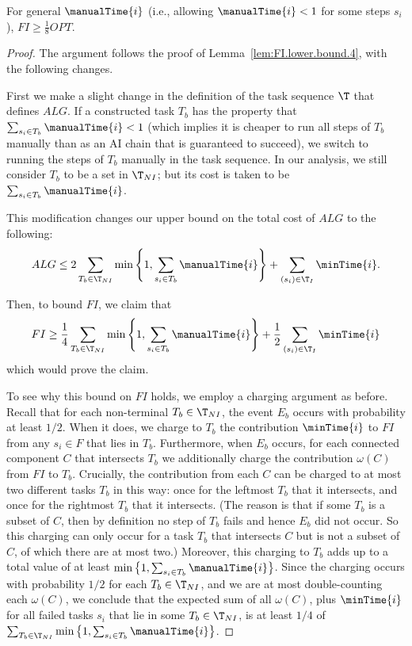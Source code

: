 \begin{lem}
\label{lem:FI.lower.bound.8}
    For general $\manualTime{i}$ (i.e., allowing $\manualTime{i} < 1$ for some steps $s_i$), $FI \geq \frac{1}{8}OPT$.
\end{lem}
\begin{proof}
    The argument follows the proof of Lemma~\ref{lem:FI.lower.bound.4}, with the following changes.

    First we make a slight change in the definition of the task sequence $\T$ that defines $ALG$.
    If a constructed task $T_b$ has the property that $\sum_{s_i \in T_b} \manualTime{i} < 1$ (which implies it is cheaper to run all steps of $T_b$ manually than as an AI chain that is guaranteed to succeed), we switch to running the steps of $T_b$ manually in the task sequence.
    In our analysis, we still consider $T_b$ to be a set in $\T_{NI}$; but its cost is taken to be $\sum_{s_i \in T_b} \manualTime{i}$.

    This modification changes our upper bound on the total cost of $ALG$ to the following:
    \[ ALG \leq 2 \sum_{T_b \in \T_{NI}} \min\left\{1, \sum_{s_i \in T_b} \manualTime{i} \right\} + \sum_{ (s_i) \in \T_I} \minTime{i}. \]

    Then, to bound $FI$, we claim that
    \[ FI \geq \frac{1}{4}\sum_{T_b \in \T_{NI}} \min\left\{1, \sum_{s_i \in T_b} \manualTime{i} \right\} + \frac{1}{2}\sum_{(s_i) \in \T_I} \minTime{i} \]
    which would prove the claim.

    To see why this bound on $FI$ holds, we employ a charging argument as before.
    Recall that for each non-terminal $T_b \in \T_{NI}$, the event $E_b$ occurs with probability at least $1/2$.
    When it does, we charge to $T_b$ the contribution $\minTime{i}$ to $FI$ from any $s_i \in F$ that lies in $T_b$.
    Furthermore, when $E_b$ occurs, for each connected component $C$ that intersects $T_b$ we additionally charge the contribution $\omega(C)$ from $FI$ to $T_b$.
    Crucially, the contribution from each $C$ can be charged to at most two different tasks $T_b$ in this way: once for the leftmost $T_b$ that it intersects, and once for the rightmost $T_b$ that it intersects.
    (The reason is that if some $T_b$ is a subset of $C$, then by definition no step of $T_b$ fails and hence $E_b$ did not occur.
    So this charging can only occur for a task $T_b$ that intersects $C$ but is not a subset of $C$, of which there are at most two.)
    Moreover, this charging to $T_b$ adds up to a  total value of at least $\min\left\{1, \sum_{s_i \in T_b} \manualTime{i} \right\}$.
    Since the charging occurs with probability $1/2$ for each $T_b \in \T_{NI}$, and we are at most double-counting each $\omega(C)$, we conclude that the expected sum of all $\omega(C)$, plus $\minTime{i}$ for all failed tasks $s_i$ that lie in some $T_b \in \T_{NI}$, is at least $1/4$ of $\sum_{T_b \in \T_{NI}}\min\left\{1, \sum_{s_i \in T_b} \manualTime{i} \right\}$.


\end{proof}
